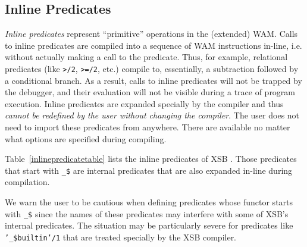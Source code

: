 \subsection{Inline Predicates}\label{inline_predicates}

{\em Inline predicates} represent ``primitive'' operations in the
(extended) WAM.  Calls to inline predicates are compiled into a
sequence of WAM instructions in-line, i.e. without actually making a
call to the predicate.  Thus, for example, relational predicates (like
{\tt >/2}, {\tt >=/2}, etc.) compile to, essentially, a subtraction
followed by a conditional branch.  As a result, calls to inline
predicates will not be trapped by the debugger, and their evaluation
will not be visible during a trace of program execution.  Inline
predicates are expanded specially by the compiler and thus {\em cannot
  be redefined by the user without changing the compiler}.  The user
does not need to import these predicates from anywhere.  There are
available no matter what options are specified during compiling.

Table~\ref{inlinepredicatetable} lists the inline predicates of
XSB \version.  Those predicates that start with \verb|_$|
are internal predicates that are also expanded in-line during
compilation.

\begin{table}[htbp]
\caption{The Inline Predicates of XSB}\label{inlinepredicatetable}
\end{table}

We warn the user to be cautious when defining predicates whose functor
starts with {\tt \_\$} since the names of these predicates may
interfere with some of XSB's internal predicates.  The situation may
be particularly severe for predicates like {\tt '\_\$builtin'/1} that
are treated specially by the XSB compiler.

